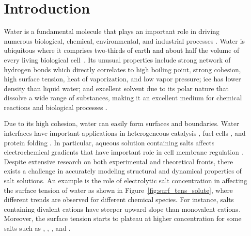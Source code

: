 \chapter{Introduction}
Water is a fundamental molecule that plays an important role  in driving
numerous biological, chemical, environmental, and industrial processes \cite{henry2005state,Kurz2008,ahuja2013green}. Water
is ubiquitous where it comprises two-thirds of earth and about half the volume of every living biological cell~\cite{Kontogeorgis2022,ling2004determines}.  Its unusual properties include  strong network
of hydrogen bonds which directly correlates to high boiling
point,	strong cohesion,
high surface
tension, heat of vaporization, and low vapor
pressure; ice has lower density than liquid water; and excellent solvent due to
its polar nature that
dissolve a wide range of substances, making it an excellent medium for chemical
reactions and biological processes \cite{Kontogeorgis2022,brini2017water}.

Due to its high cohesion, water can easily form surfaces and boundaries. Water
interfaces have important applications in heterogeneous catalysis \cite{fechete2012past}, fuel cells \cite{Owejan2009},
and protein folding \cite{levy2006water}. In particular, aqueous solution containing salts affects
electrochemical gradients  that have important role in	cell membrane
regulation \cite{lai2006distribution}. Despite extensive research on both experimental and theoretical fronts,
there exists a challenge in accurately modeling structural and dynamical
properties of salt solutions. An example is the role of electrolytic salt concentration in
affecting the surface tension of water as shown in
Figure~\ref{fig:surf_tens_solute}, where different trends are observed for
different chemical species. For instance, salts containing divalent cations have steeper upward slope  than monovalent cations. Moreover, the surface tension starts to plateau at higher concentration for some  salts such as , , , and .

